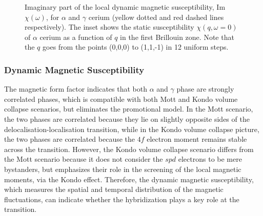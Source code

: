 \documentclass[10pt]{ruthesis}
\begin{document}
{%
\begin{figure}[!t]
\caption{
  Imaginary part of the local dynamic magnetic susceptibility,
  Im$\chi(\omega)$, for $\alpha$ and $\gamma$ cerium (yellow dotted and red dashed lines  respectively). The inset shows the static
  susceptibility $\chi(q, \omega=0)$ of $\alpha$ cerium as a function of $q$ in the first Brillouin zone. Note that
  the $q$ goes from the points (0,0,0) to (1,1,-1) in 12 uniform
  steps.
}
\label{Susc_both}
\end{figure}
%
\subsubsection{ Dynamic Magnetic Susceptibility}
The magnetic form factor indicates that both $\alpha$ and $\gamma$ phase are strongly
correlated phases, which is compatible with both Mott and Kondo volume
collapse scenarios, but eliminates the promotional model.  In the Mott
scenario, the two phases are correlated because they lie on slightly
opposite sides of the delocalisation-localisation transition, while in
the Kondo volume collapse picture, the two phases are correlated
because the $4f$ electron moment remains stable across the transition.
However, the Kondo
volume collapse scenario differs from the Mott scenario because it
does not consider the $spd$ electrons to be mere bystanders, but
emphasizes their role in the screening of the local magnetic moments,
via the Kondo effect.  Therefore, the dynamic magnetic susceptibility,
which measures the spatial and temporal distribution of the magnetic
fluctuations, can indicate whether the hybridization plays a key role
at the transition.

}
\end{document}
